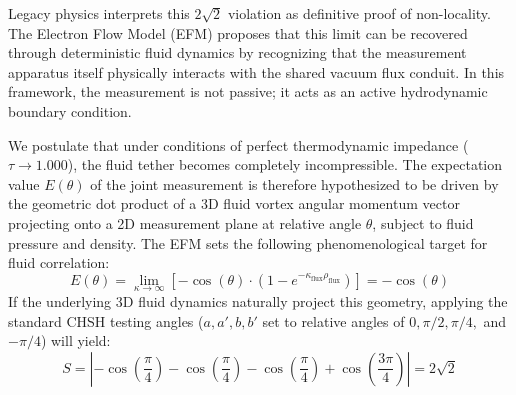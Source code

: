 \documentclass[11pt, a4paper]{article}
\begin{document}
  Legacy physics interprets this $2\sqrt{2}$ violation as definitive proof of non-locality. The Electron Flow Model (EFM) proposes that this limit can be recovered through deterministic fluid dynamics by recognizing that the measurement apparatus itself physically interacts with the shared vacuum flux conduit. In this framework, the measurement is not passive; it acts as an active hydrodynamic boundary condition.
  
  We postulate that under conditions of perfect thermodynamic impedance ($\tau \to 1.000$), the fluid tether becomes completely incompressible. The expectation value $E(\theta)$ of the joint measurement is therefore hypothesized to be driven by the geometric dot product of a 3D fluid vortex angular momentum vector projecting onto a 2D measurement plane at relative angle $\theta$, subject to fluid pressure and density. The EFM sets the following phenomenological target for fluid correlation:
  \begin{equation}
    E(\theta) = \lim_{\kappa \to \infty} \left[ -\cos(\theta) \cdot \left(1 - e^{-\kappa_{\text{flux}} \rho_{\text{flux}}}\right) \right] = -\cos(\theta)
    \label{eq:chsh_target}
  \end{equation}
  If the underlying 3D fluid dynamics naturally project this geometry, applying the standard CHSH testing angles ($a, a', b, b'$ set to relative angles of $0, \pi/2, \pi/4,$ and $-\pi/4$) will yield:
  \begin{equation}
    S = \left| -\cos\left(\frac{\pi}{4}\right) - \cos\left(\frac{\pi}{4}\right) - \cos\left(\frac{\pi}{4}\right) + \cos\left(\frac{3\pi}{4}\right) \right| = 2\sqrt{2}
  \end{equation}
\end{document}
